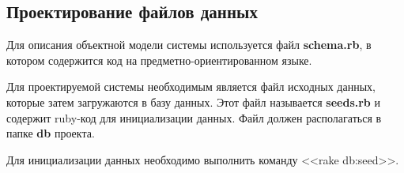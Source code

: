 \subsection{Проектирование файлов данных}

Для описания объектной модели системы используется файл \textbf{schema.rb}, в котором содержится код на предметно-ориентированном языке.

Для проектируемой системы необходимым является файл исходных данных, которые затем загружаются в базу данных. Этот файл называется \textbf{seeds.rb} и содержит ruby-код для инициализации данных. Файл должен располагаться в папке \textbf{db} проекта.

Для инициализации данных необходимо выполнить команду <<rake db:seed>>.
